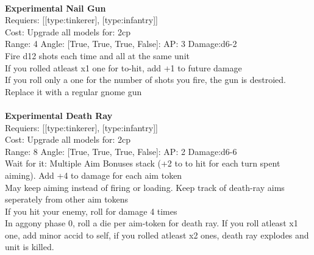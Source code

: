 \ \\
{\bf Experimental Nail Gun } \\

Requiers: [[type:tinkerer], [type:infantry]] \\
Cost: Upgrade all models for: 2cp \\


Range: 4  Angle: [True, True, True, False]: AP: 3 Damage:d6-2 \\
Fire d12 shots each time and all at the same unit\\ 
If you rolled atleast x1 one for to-hit, add +1 to future damage\\ 
If you roll only a one for the number of shots you fire, the gun is destroied. Replace it with a regular gnome gun\\ 








\ \\
{\bf Experimental Death Ray } \\

Requiers: [[type:tinkerer], [type:infantry]] \\
Cost: Upgrade all models for: 2cp \\


Range: 8  Angle: [True, True, True, False]: AP: 2 Damage:d6-6 \\
Wait for it: Multiple Aim Bonuses stack (+2 to to hit for each turn spent aiming). Add +4 to damage for each aim token\\ 
May keep aiming instead of firing or loading. Keep track of death-ray aims seperately from other aim tokens\\ 
If you hit your enemy, roll for damage 4 times\\ 
In aggony phase 0, roll a die per aim-token for death ray. If you roll atleast x1 one, add minor accid to self, if you rolled atleast x2 ones, death ray explodes and unit is killed.\\ 








